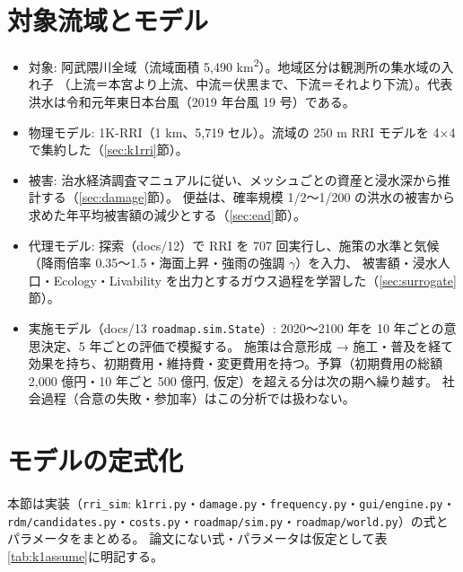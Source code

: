 \documentclass[a4paper,10pt]{ltjsarticle}
\begin{document}
\section{対象流域とモデル}
\label{sec:model}

\begin{itemize}
  \item 対象: 阿武隈川全域（流域面積 5,490 km\textsuperscript{2}）。地域区分は観測所の集水域の入れ子
    （上流＝本宮より上流、中流＝伏黒まで、下流＝それより下流）。代表洪水は令和元年東日本台風（2019 年台風 19 号）である。
  \item 物理モデル: 1K-RRI\cite{sugawara2024}（1 km、5,719 セル）。流域の 250 m RRI モデル\cite{sayama2012}を 4×4 で集約した（\ref{sec:k1rri}節）。
  \item 被害: 治水経済調査マニュアル\cite{mlit_manual}に従い、メッシュごとの資産と浸水深から推計する（\ref{sec:damage}節）。
    便益は、確率規模 1/2〜1/200 の洪水の被害から求めた年平均被害額の減少とする（\ref{sec:ead}節）。
  \item 代理モデル: 探索（docs/12）で RRI を 707 回実行し、施策の水準と気候（降雨倍率 0.35〜1.5・海面上昇・強雨の強調 $\gamma$）を入力、
    被害額・浸水人口・Ecology・Livability を出力とするガウス過程を学習した（\ref{sec:surrogate}節）。
  \item 実施モデル（docs/13 \texttt{roadmap.sim.State}）: 2020〜2100 年を 10 年ごとの意思決定、5 年ごとの評価で模擬する。
    施策は合意形成 → 施工・普及を経て効果を持ち、初期費用・維持費・変更費用を持つ。予算（初期費用の総額 2,000 億円・10 年ごと 500 億円, 仮定）を超える分は次の期へ繰り越す。
    社会過程（合意の失敗・参加率）はこの分析では扱わない。
\end{itemize}

\section{モデルの定式化}
\label{sec:formulation}

本節は実装（\texttt{rri\_sim}: \texttt{k1rri.py}・\texttt{damage.py}・\texttt{frequency.py}・\texttt{gui/engine.py}・\texttt{rdm/candidates.py}・\texttt{costs.py}・\texttt{roadmap/sim.py}・\texttt{roadmap/world.py}）の式とパラメータをまとめる。
論文\cite{sugawara2024}にない式・パラメータは仮定として表\ref{tab:k1assume}に明記する。
\end{document}
